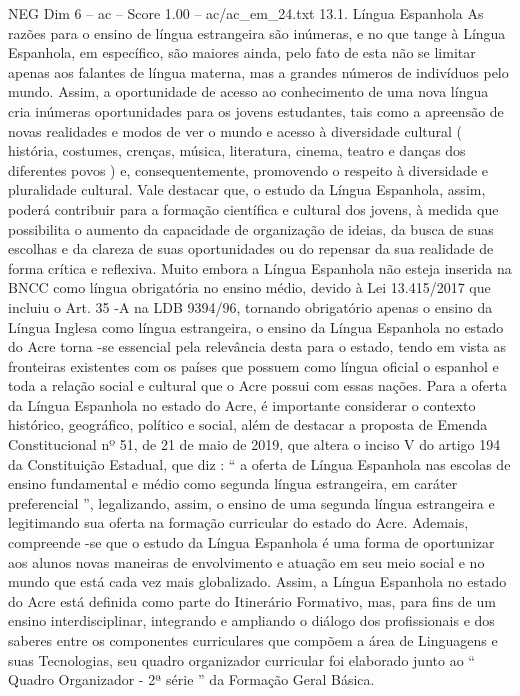 \begin{textsample}{NEG Dim 6 – ac – Score 1.00 – ac/ac\_em\_24.txt}  \label{ex:f6_neg_139}
13.1.
Língua Espanhola As razões para o ensino de língua estrangeira são inúmeras, e no que tange à Língua Espanhola, em específico, são maiores ainda, pelo fato de esta não se limitar apenas aos falantes de língua materna, mas a grandes números de indivíduos pelo mundo.
Assim, a oportunidade de acesso ao conhecimento de uma nova língua cria inúmeras oportunidades para os jovens estudantes, tais como a apreensão de novas realidades e modos de ver o mundo e acesso à diversidade cultural ( história, costumes, crenças, música, literatura, cinema, teatro e danças dos diferentes povos ) e, consequentemente, promovendo o respeito à diversidade e pluralidade cultural.
Vale destacar que, o estudo da Língua Espanhola, assim, poderá contribuir para a formação científica e cultural dos jovens, à medida que possibilita o aumento da capacidade de organização de ideias, da busca de suas escolhas e da clareza de suas oportunidades ou do repensar da sua realidade de forma crítica e reflexiva.
Muito embora a Língua Espanhola não esteja inserida na BNCC como língua obrigatória no ensino médio, devido à Lei 13.415/2017 que incluiu o Art. 35 -A na LDB 9394/96, tornando obrigatório apenas o ensino da Língua Inglesa como língua estrangeira, o ensino da Língua Espanhola no estado do Acre torna -se essencial pela relevância desta para o estado, tendo em vista as fronteiras existentes com os países que possuem como língua oficial o espanhol e toda a relação social e cultural que o Acre possui com essas nações.
Para a oferta da Língua Espanhola no estado do Acre, é importante considerar o contexto histórico, geográfico, político e social, além de destacar a proposta de Emenda Constitucional nº 51, de 21 de maio de 2019, que altera o inciso V do artigo 194 da Constituição Estadual, que diz : “ a oferta de Língua Espanhola nas escolas de ensino fundamental e médio como segunda língua estrangeira, em caráter preferencial ”, legalizando, assim, o ensino de uma segunda língua estrangeira e legitimando sua oferta na formação curricular do estado do Acre.
Ademais, compreende -se que o estudo da Língua Espanhola é uma forma de oportunizar aos alunos novas maneiras de envolvimento e atuação em seu meio social e no mundo que está cada vez mais globalizado.
Assim, a Língua Espanhola no estado do Acre está definida como parte do Itinerário Formativo, mas, para fins de um ensino interdisciplinar, integrando e ampliando o diálogo dos profissionais e dos saberes entre os componentes curriculares que compõem a área de Linguagens e suas Tecnologias, seu quadro organizador curricular foi elaborado junto ao “ Quadro Organizador - 2ª série ” da Formação Geral Básica.

\end{textsample}
